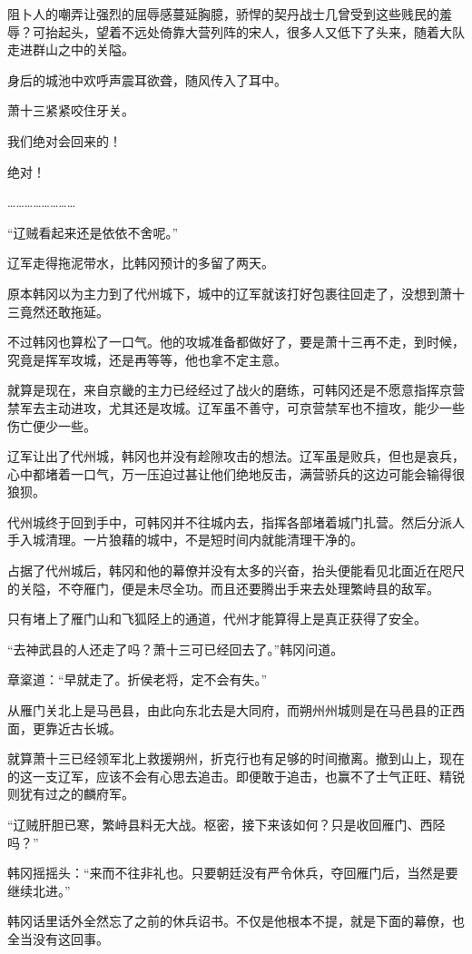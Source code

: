 阻卜人的嘲弄让强烈的屈辱感蔓延胸臆，骄悍的契丹战士几曾受到这些贱民的羞辱？可抬起头，望着不远处倚靠大营列阵的宋人，很多人又低下了头来，随着大队走进群山之中的关隘。

身后的城池中欢呼声震耳欲聋，随风传入了耳中。

萧十三紧紧咬住牙关。

我们绝对会回来的！

绝对！

……………………

“辽贼看起来还是依依不舍呢。”

辽军走得拖泥带水，比韩冈预计的多留了两天。

原本韩冈以为主力到了代州城下，城中的辽军就该打好包裹往回走了，没想到萧十三竟然还敢拖延。

不过韩冈也算松了一口气。他的攻城准备都做好了，要是萧十三再不走，到时候，究竟是挥军攻城，还是再等等，他也拿不定主意。

就算是现在，来自京畿的主力已经经过了战火的磨练，可韩冈还是不愿意指挥京营禁军去主动进攻，尤其还是攻城。辽军虽不善守，可京营禁军也不擅攻，能少一些伤亡便少一些。

辽军让出了代州城，韩冈也并没有趁隙攻击的想法。辽军虽是败兵，但也是哀兵，心中都堵着一口气，万一压迫过甚让他们绝地反击，满营骄兵的这边可能会输得很狼狈。

代州城终于回到手中，可韩冈并不往城内去，指挥各部堵着城门扎营。然后分派人手入城清理。一片狼藉的城中，不是短时间内就能清理干净的。

占据了代州城后，韩冈和他的幕僚并没有太多的兴奋，抬头便能看见北面近在咫尺的关隘，不夺雁门，便是未尽全功。而且还要腾出手来去处理繁峙县的敌军。

只有堵上了雁门山和飞狐陉上的通道，代州才能算得上是真正获得了安全。

“去神武县的人还走了吗？萧十三可已经回去了。”韩冈问道。

章楶道：“早就走了。折侯老将，定不会有失。”

从雁门关北上是马邑县，由此向东北去是大同府，而朔州州城则是在马邑县的正西面，更靠近古长城。

就算萧十三已经领军北上救援朔州，折克行也有足够的时间撤离。撤到山上，现在的这一支辽军，应该不会有心思去追击。即便敢于追击，也赢不了士气正旺、精锐则犹有过之的麟府军。

“辽贼肝胆已寒，繁峙县料无大战。枢密，接下来该如何？只是收回雁门、西陉吗？”

韩冈摇摇头：“来而不往非礼也。只要朝廷没有严令休兵，夺回雁门后，当然是要继续北进。”

韩冈话里话外全然忘了之前的休兵诏书。不仅是他根本不提，就是下面的幕僚，也全当没有这回事。


